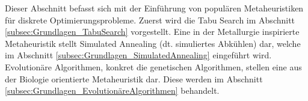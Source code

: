 Dieser Abschnitt befasst sich mit der Einführung von populären Metaheuristiken für diskrete Optimierungsprobleme. Zuerst wird die Tabu Search im Abschnitt \ref{subsec:Grundlagen_TabuSearch} vorgestellt. Eine in der Metallurgie inspirierte Metaheuristik stellt Simulated Annealing (dt. simuliertes Abkühlen) dar, welche im Abschnitt \ref{subsec:Grundlagen_SimulatedAnnealing} eingeführt wird. Evolutionäre Algorithmen, konkret die genetischen Algorithmen, stellen eine aus der Biologie orientierte Metaheuristik dar. Diese werden im Abschnitt \ref{subsec:Grundlagen_EvolutionäreAlgorithmen} behandelt.




